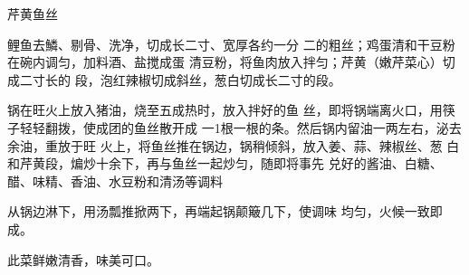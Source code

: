 \begin{recipe}{芹黄鱼丝}

\ingredients


\cooking

\step 鲤鱼去鱗、剔骨、洗净，切成长二寸、宽厚各约一分 二的粗丝；鸡蛋清和干豆粉在碗内调匀，加料酒、盐搅成蛋 清豆粉，将鱼肉放入拌匀；芹黄（嫩芹菜心）切成二寸长的 段，泡红辣椒切成斜丝，葱白切成长二寸的段。

\step 锅在旺火上放入猪油，烧至五成热时，放入拌好的鱼 丝，即将锅端离火口，用筷子轻轻翻拨，使成团的鱼丝散开成 一1根一根的条。然后锅内留油一两左右，泌去余油，重放于旺 火上，将鱼丝推在锅边，锅稍倾斜，放入姜、蒜、辣椒丝、葱 白和芹黄段，煸炒十余下，再与鱼丝一起炒匀，随即将事先 兑好的酱油、白糖、醋、味精、香油、水豆粉和清汤等调料

从锅边淋下，用汤瓢推掀两下，再端起锅颠簸几下，使调味 均匀，火候一致即成。

\notes

此菜鲜嫩清香，味美可口。

\end{recipe}

